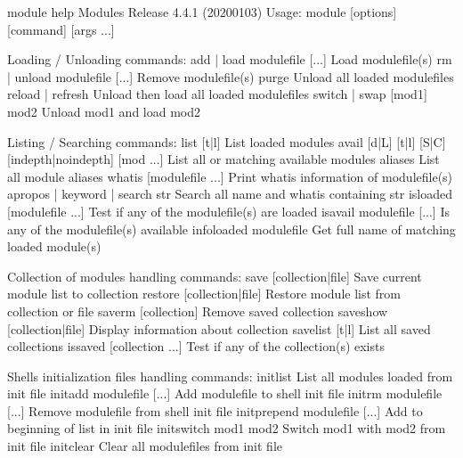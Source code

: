 \documentclass[a4paper,10pt,english]{sphinxmanual}
\begin{document}
\begin{sphinxVerbatim}[commandchars=\\\{\}]
\PYGZdl{}\PYGZgt{} module \PYGZhy{}\PYGZhy{}help
Modules Release 4.4.1 (2020\PYGZhy{}01\PYGZhy{}03)
Usage: module [options] [command] [args ...]

Loading / Unloading commands:
  add | load      modulefile [...]  Load modulefile(s)
  rm | unload     modulefile [...]  Remove modulefile(s)
  purge                             Unload all loaded modulefiles
  reload | refresh                  Unload then load all loaded modulefiles
  switch | swap   [mod1] mod2       Unload mod1 and load mod2

Listing / Searching commands:
  list            [\PYGZhy{}t|\PYGZhy{}l]           List loaded modules
  avail   [\PYGZhy{}d|\PYGZhy{}L] [\PYGZhy{}t|\PYGZhy{}l] [\PYGZhy{}S|\PYGZhy{}C] [\PYGZhy{}\PYGZhy{}indepth|\PYGZhy{}\PYGZhy{}no\PYGZhy{}indepth] [mod ...]
                                    List all or matching available modules
  aliases                           List all module aliases
  whatis          [modulefile ...]  Print whatis information of modulefile(s)
  apropos | keyword | search  str   Search all name and whatis containing str
  is\PYGZhy{}loaded       [modulefile ...]  Test if any of the modulefile(s) are loaded
  is\PYGZhy{}avail        modulefile [...]  Is any of the modulefile(s) available
  info\PYGZhy{}loaded     modulefile        Get full name of matching loaded module(s)

Collection of modules handling commands:
  save            [collection|file] Save current module list to collection
  restore         [collection|file] Restore module list from collection or file
  saverm          [collection]      Remove saved collection
  saveshow        [collection|file] Display information about collection
  savelist        [\PYGZhy{}t|\PYGZhy{}l]           List all saved collections
  is\PYGZhy{}saved        [collection ...]  Test if any of the collection(s) exists

Shell\PYGZsq{}s initialization files handling commands:
  initlist                          List all modules loaded from init file
  initadd         modulefile [...]  Add modulefile to shell init file
  initrm          modulefile [...]  Remove modulefile from shell init file
  initprepend     modulefile [...]  Add to beginning of list in init file
  initswitch      mod1 mod2         Switch mod1 with mod2 from init file
  initclear                         Clear all modulefiles from init file


\end{sphinxVerbatim}
\end{document}
